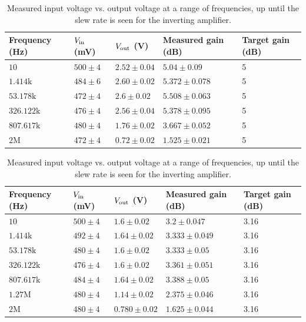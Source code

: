 \documentclass[11pt]{article}
\begin{document}
\begin{table}[H]
	\centering
	\begin{tabular}{|l|l|l|l|l|}
	\hline
	Frequency (Hz)    & $V_{\rm in}$ (mV) & $V_{\rm out}$ (V) & Measured gain (dB) & Target gain (dB) \\
	\hline
	$10$              & $500 \pm 4$      & $2.52 \pm 0.04$   & $5.04 \pm 0.09$    & 5                \\
	$1.414\text{k}$   & $484 \pm 6$      & $2.60 \pm 0.02$   & $5.372 \pm 0.078$  & 5                \\
	$53.178\text{k}$  & $472 \pm 4$      & $2.6 \pm 0.02$    & $5.508 \pm 0.063$  & 5                \\
	$326.122\text{k}$ & $476 \pm 4$      & $2.56 \pm 0.04$   & $5.378 \pm 0.095$  & 5                \\
	$807.617\text{k}$ & $480 \pm 4$      & $1.76 \pm 0.02$   & $3.667 \pm 0.052$  & 5                \\
	$2\text{M}$       & $472 \pm 4$      & $0.72 \pm 0.02$   & $1.525 \pm 0.021$  & 5                \\
	\hline
	\end{tabular}
	\caption{Measured input voltage vs. output voltage at a range of
	frequencies, up until the slew rate is seen for the inverting amplifier.}
\end{table}

\begin{table}[H]
	\centering
	\begin{tabular}{|l|l|l|l|l|}
	\hline
	Frequency (Hz)    & $V_{\rm in}$ (mV) & $V_{\rm out}$ (V) & Measured gain (dB) & Target gain (dB) \\
	\hline
	$10$              & $500 \pm 4$      & $1.6 \pm 0.02$    & $3.2 \pm 0.047$    & 3.16             \\
	$1.414\text{k}$   & $492 \pm 4$      & $1.64 \pm 0.02$   & $3.333 \pm 0.049$  & 3.16             \\
	$53.178\text{k}$  & $480 \pm 4$      & $1.6 \pm 0.02$    & $3.333 \pm 0.05$   & 3.16             \\
	$326.122\text{k}$ & $476 \pm 4$      & $1.6 \pm 0.02$    & $3.361 \pm 0.051$  & 3.16             \\
	$807.617\text{k}$ & $484 \pm 4$      & $1.64 \pm 0.02$   & $3.388 \pm 0.05$   & 3.16             \\
	$1.27\text{M}$    & $480 \pm 4$      & $1.14 \pm 0.02$   & $2.375 \pm 0.046$  & 3.16             \\
	$2\text{M}$       & $480 \pm 4$      & $0.780 \pm 0.02$  & $1.625 \pm 0.044$  & 3.16             \\
	\hline
	\end{tabular}
	\caption{Measured input voltage vs. output voltage at a range of
	frequencies, up until the slew rate is seen for the inverting amplifier.}
\end{table}
\end{document}
